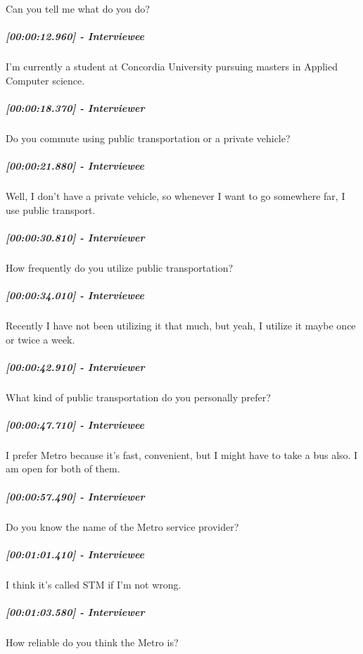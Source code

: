 \documentclass[a4paper,12pt]{article}
\begin{document}
Can you tell me what do you do?

\hypertarget{interviewee-1}{%
\subparagraph{{[}00:00:12.960{]} - Interviewee}\label{interviewee-1}}

I'm currently a student at Concordia University pursuing masters in
Applied Computer science.

\hypertarget{interviewer-2}{%
\subparagraph{{[}00:00:18.370{]} - Interviewer}\label{interviewer-2}}

Do you commute using public transportation or a private vehicle?

\hypertarget{interviewee-2}{%
\subparagraph{{[}00:00:21.880{]} - Interviewee}\label{interviewee-2}}

Well, I don't have a private vehicle, so whenever I want to go somewhere
far, I use public transport.

\hypertarget{interviewer-3}{%
\subparagraph{{[}00:00:30.810{]} - Interviewer}\label{interviewer-3}}

How frequently do you utilize public transportation?

\hypertarget{interviewee-3}{%
\subparagraph{{[}00:00:34.010{]} - Interviewee}\label{interviewee-3}}

Recently I have not been utilizing it that much, but yeah, I utilize it
maybe once or twice a week.

\hypertarget{interviewer-4}{%
\subparagraph{{[}00:00:42.910{]} - Interviewer}\label{interviewer-4}}

What kind of public transportation do you personally prefer?

\hypertarget{interviewee-4}{%
\subparagraph{{[}00:00:47.710{]} - Interviewee}\label{interviewee-4}}

I prefer Metro because it's fast, convenient, but I might have to take a
bus also. I am open for both of them.

\hypertarget{interviewer-5}{%
\subparagraph{{[}00:00:57.490{]} - Interviewer}\label{interviewer-5}}

Do you know the name of the Metro service provider?

\hypertarget{interviewee-5}{%
\subparagraph{{[}00:01:01.410{]} - Interviewee}\label{interviewee-5}}

I think it's called STM if I'm not wrong.

\hypertarget{interviewer-6}{%
\subparagraph{{[}00:01:03.580{]} - Interviewer}\label{interviewer-6}}

How reliable do you think the Metro is?
\end{document}
